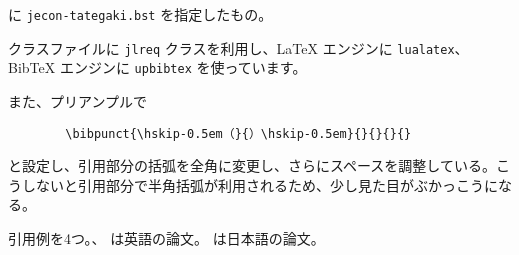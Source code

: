 \documentclass[article,tate,landscape]{jlreq}
\begin{document}
\verb|| に \verb|jecon-tategaki.bst| を指定したもの。
\vspace*{1em}

クラスファイルに \texttt{jlreq} クラスを利用し、LaTeX エンジンに
\texttt{lualatex}、BibTeX エンジンに \texttt{upbibtex} を使っています。

\vspace*{1em}

また、プリアンプルで
\begin{verbatim}
        \bibpunct{\hskip-0.5em（}{）\hskip-0.5em}{}{}{}{}
\end{verbatim}
と設定し、引用部分の括弧を全角に変更し、さらにスペースを調整している。こ
うしないと引用部分で半角括弧が利用されるため、少し見た目がぶかっこうにな
る。

\vspace*{1em}

引用例を4つ。\citet{ishikawa03:_green_gas_emiss_contr_open_econom}、
\citet{takeda06:_cge_analy_welfar_effec_trade} は英語の論文。
\citet{oyama99:_mark_stru}  \citet{kuroda97jp:keo} は日本語の論文。

\nocite{*}



%

\end{document}
